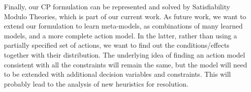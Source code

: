\documentclass{ecai}
\begin{document}
Finally,
our CP formulation can be represented and solved by Satisfiability Modulo Theories, which is part of our current work. As future work, we want to extend our formulation to learn meta-models, as combinations of many learned models, and a more complete action model.
In the latter, rather than using a partially specified set of actions, we want to find out the conditions/effects together with their distribution.
The underlying idea of finding an action model consistent with all the constraints will remain the same, but the model will need to be extended with additional decision variables and constraints. %
This will probably lead to the analysis of new heuristics for resolution.



\end{document}
